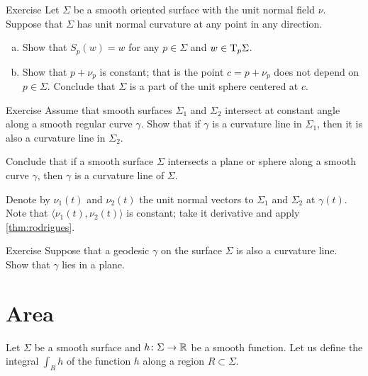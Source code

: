 \begin{thm}{Exercise}\label{ex:normal-curvature=const}
Let $\Sigma$ be a smooth oriented surface with the unit normal field $\nu$.
Suppose that $\Sigma$ has unit normal curvature at any point in any direction.
\begin{enumerate}[(a)]
 \item Show that $S_p(w)=w$ for any $p\in\Sigma$ and $w\in \mathrm{T}_p\Sigma$.
 \item Show that $p+\nu_p$ is constant; that is the point $c=p+\nu_p$ does not depend on $p\in\Sigma$.
 Conclude that $\Sigma$ is a part of the unit sphere centered at $c$.
\end{enumerate}

\end{thm}


\begin{thm}{Exercise}\label{ex:shape-curvature-line}
Assume that smooth surfaces $\Sigma_1$ and $\Sigma_2$ intersect at constant angle along a smooth regular curve $\gamma$.
Show that if $\gamma$ is a curvature line in $\Sigma_1$, then it is also a curvature line in $\Sigma_2$.

Conclude that if a smooth surface $\Sigma$ intersects a plane or sphere along a smooth curve $\gamma$,
then $\gamma$ is a curvature line of $\Sigma$.
\end{thm}

  Denote by $\nu_1(t)$ and $\nu_2(t)$ the unit normal vectors to $\Sigma_1$ and $\Sigma_2$ at $\gamma(t)$.
Note that $\langle \nu_1(t),\nu_2(t)\rangle$ is constant; take it derivative and apply \ref{thm:rodrigues}.

\begin{thm}{Exercise}\label{ex:geodesic-curvature-line}
Suppose that a geodesic $\gamma$ on the surface $\Sigma$ is also a curvature line.
Show that $\gamma$ lies in a plane.
\end{thm}

\section*{Area}


Let $\Sigma$ be a smooth surface and $h\colon\Sigma\to\mathbb{R}$ be a smooth function.
Let us define the integral $\int_R h$ of the function $h$ along a region $R\subset \Sigma$.

